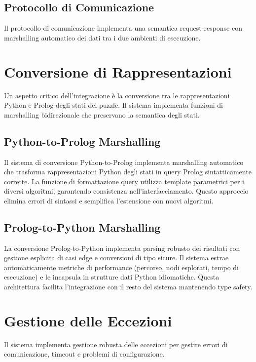 \documentclass[12pt,a4paper]{report}
\theoremstyle{definition}
\begin{document}
\subsection{Protocollo di Comunicazione}

Il protocollo di comunicazione implementa una semantica request-response con marshalling automatico dei dati tra i due ambienti di esecuzione.

\section{Conversione di Rappresentazioni}

Un aspetto critico dell'integrazione è la conversione tra le rappresentazioni Python e Prolog degli stati del puzzle. Il sistema implementa funzioni di marshalling bidirezionale che preservano la semantica degli stati.

\subsection{Python-to-Prolog Marshalling}

Il sistema di conversione Python-to-Prolog implementa marshalling automatico che trasforma rappresentazioni Python degli stati in query Prolog sintatticamente corrette. La funzione di formattazione query utilizza template parametrici per i diversi algoritmi, garantendo consistenza nell'interfacciamento. Questo approccio elimina errori di sintassi e semplifica l'estensione con nuovi algoritmi.

\subsection{Prolog-to-Python Marshalling}

La conversione Prolog-to-Python implementa parsing robusto dei risultati con gestione esplicita di casi edge e conversioni di tipo sicure. Il sistema estrae automaticamente metriche di performance (percorso, nodi esplorati, tempo di esecuzione) e le incapsula in strutture dati Python idiomatiche. Questa architettura facilita l'integrazione con il resto del sistema mantenendo type safety.

\section{Gestione delle Eccezioni}

Il sistema implementa gestione robusta delle eccezioni per gestire errori di comunicazione, timeout e problemi di configurazione.
\end{document}
